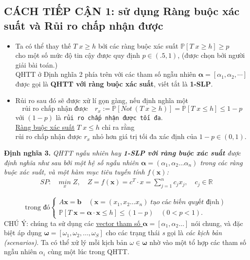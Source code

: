 \documentclass[a4paper]{article}
\begin{document}
	\subsection{CÁCH TIẾP CẬN 1: sử dụng Ràng buộc xác suất và Rủi ro chấp nhận được}
	\begin{itemize}
        \item Ta có thể thay thế $T \; x \geq h$ bởi các ràng buộc xác suất $\mathbb{P}[T \; x \geq h] \geq p$\\
        cho một số mức độ tin cậy được quy định $p \in (.5,1)$, (được chọn bởi người giải bài toán.)\\
        QHTT ở Định nghĩa 2 phía trên với các tham số ngẫu nhiên $\boldsymbol{\alpha}=[\alpha_1, \alpha_2, \dotsb]$
        được gọi là \textbf{QHTT với ràng buộc xác suất}, viết tắt là \textbf{1-SLP}.
        \item Rủi ro sau đó sẽ được xử lí gọn gàng, nếu định nghĩa một
            \begin{displaymath}
                \text{rủi ro chấp nhận được} \quad r_{x} \mathrel{:=} \mathbb{P}[Not \: (T \; x \geq h)] =
                \mathbb{P}[T \; x \leq h] \leq 1-p
            \end{displaymath}
            với $(1-p)$ là \texttt{rủi ro chấp nhận được tối đa}.\\
            \underline{Ràng buộc xác suất} $T \; x \leq h$ chỉ ra rằng\\
            rủi ro chấp nhận được $r_x$ nhỏ hơn giá trị tối đa xác định của $1-p \in (0,1)$.
    \end{itemize}
    \textbf{Định nghĩa 3.} \textit{QHTT ngẫu nhiên hay \textbf{1-SLP với ràng buộc xác suất} được
        định nghĩa như sau bởi một hệ số ngẫu nhiên $\boldsymbol{\alpha} = (\alpha_1, \alpha_2 \dotsc \alpha_n)$
        trong các ràng buộc xác suất, và một hàm mục tiêu tuyến tính $f(\boldsymbol{x})$:}
        \begin{gather}
            SP: \quad \underset{x}{min} \; Z, \quad Z=f(\boldsymbol{x})=c^T \cdot x=\sum_{j=1}^{n} c_{j} x_{j}, \quad c_{j} \in \mathbb{R}
        \end{gather}
        
        \begin{displaymath}
            \text{trong đó}
            \begin{cases}
                A\boldsymbol{x}=\boldsymbol{b} \quad (\boldsymbol{x}= (x_1, x_2 \dotsc x_n) \; \textit{tạo các biến quyết định}) \\
                \mathbb{P}[T \; \boldsymbol{x}= \boldsymbol{\alpha} \cdot \boldsymbol{x} \leq h] \leq (1-p)\quad (0 < p < 1).
            \end{cases}
        \end{displaymath}
        CHÚ Ý: chúng ta sử dụng các \underline{vector tham số $\boldsymbol{\alpha}=[\alpha_1, \alpha_2 \dotsc]$} 
            nói chung, và đặc biệt áp dụng $\boldsymbol{\omega} = [\omega_1, \omega_2, \dots, \omega_S]$ cho
            các trạng thái \textit{s} gọi là \textit{các kịch bản (scenarios)}. Ta có thể xử lý mỗi kịch bản 
            $\omega \in \boldsymbol{\omega}$ nhờ vào một tổ hợp các tham số ngẫu nhiên $\alpha_i$ cùng một lúc trong QHTT.
\end{document}
